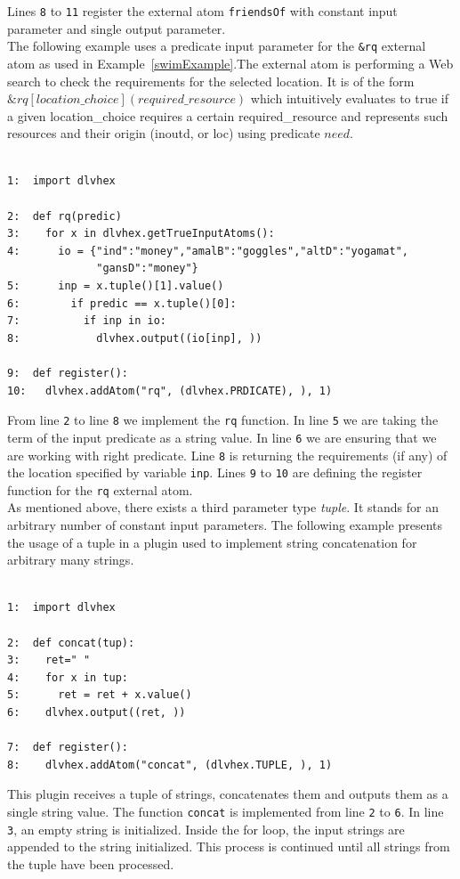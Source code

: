 \documentclass[a4paper, titlepage]{article}
\newcommand{\ext}[3]{\ensuremath{\&{#1}[#2](#3)}}
\begin{document}
Lines \verb+8+ to \verb+11+ register the external atom 
\verb+friendsOf+ with constant input parameter and 
single output parameter. 
\bigskip \\
The following example uses a predicate input parameter 
for the \verb+&rq+ external atom as used in Example~\ref{swimExample}.The external atom is performing 
a Web search to check the requirements for the selected location. It is of the form 
$\ext{\mathit{rq}}{\mathit{location\_choice}}
{\mathit{required\_resource}}$ which intuitively evaluates 
to true if a given location\_choice requires a certain 
required\_resource and represents such resources and their 
origin (inoutd, or loc) using predicate $\mathit{need}$. 
\begin{exmp}
\label{predicateAsInput}
\begin{verbatim}

1:  import dlvhex 

2:  def rq(predic)
3:    for x in dlvhex.getTrueInputAtoms():
4:      io = {"ind":"money","amalB":"goggles","altD":"yogamat",
              "gansD":"money"}
5:      inp = x.tuple()[1].value()
6:        if predic == x.tuple()[0]:
7:          if inp in io:
8:            dlvhex.output((io[inp], ))

9:  def register():
10:   dlvhex.addAtom("rq", (dlvhex.PRDICATE), ), 1)
\end{verbatim}
\end{exmp}

From line \verb+2+ to line \verb+8+ we implement the \verb+rq+ function. In line \verb+5+ we are taking the term of the input predicate as 
a string value. In line \verb+6+ we are ensuring that we are  
working with right predicate. Line \verb+8+ is returning  
the requirements (if any) of the location specified by variable 
\verb+inp+. Lines \verb+9+ to \verb+10+ are defining the register 
function for the \verb+rq+ external atom.
\bigskip \\
As mentioned above, there exists a third parameter type \emph{tuple}. It stands for an arbitrary number of constant input parameters. The following example presents the usage of a tuple in a plugin used to implement string concatenation for arbitrary many strings.  
\begin{exmp}
\label{tupleAsInput}
\begin{verbatim}

1:  import dlvhex

2:  def concat(tup):
3:    ret=" "
4:    for x in tup:
5:      ret = ret + x.value()
6:    dlvhex.output((ret, ))

7:  def register():
8:    dlvhex.addAtom("concat", (dlvhex.TUPLE, ), 1)
\end{verbatim}
\end{exmp}
This plugin receives a tuple of strings, concatenates 
them and outputs them as a single string value. The function \verb+concat+ is implemented from line \verb+2+ to \verb+6+. In line \verb+3+, an 
empty string is initialized. Inside the for loop, the input 
strings are appended to the string initialized. This process 
is continued until all strings from the tuple have been processed.  
 
\end{document}
